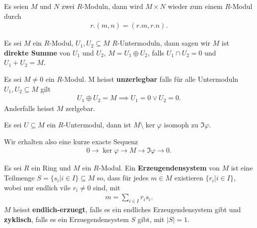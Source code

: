 \documentclass[../Algebra_script.tex]{subfiles}
\begin{document}
    \begin{definition}
        Es seien $M$ und $N$ zwei $R$-Moduln, dann wird $M \times N$ wieder zum einem $R$-Modul durch
        \begin{align*}
            r.(m, n) = (r.m, r.n)
        .\end{align*}
    \end{definition}

    \begin{definition}
        Es sei $M$ ein $R$-Modul, $U_1, U_2 \subseteq M$ $R$-Untermoduln, dann sagen wir $M$ ist \textbf{direkte Summe} von  $U_1$ und $U_2$, $M = U_1 \oplus
        U_2$, falls $U_1 \cap U_2 = 0$ und $U_1 + U_2 = M$.
    \end{definition}

    \begin{definition}
        Es sei $M \neq 0$ ein $R$-Modul. M heisst \textbf{unzerlegbar} falls für alle Untermoduln $U_1, U_2 \subseteq M$ gilt 
        \begin{align*}
            U_1 \oplus U_2 = M \implies U_1 = 0 \vee U_2 = 0
        .\end{align*}
        Anderfalls heisst $M$ zerlgebar.
    \end{definition}

    \begin{proposition}
        Es sei $U \subseteq M$ ein $R$-Untermodul, dann ist $M\setminus \ker \varphi$ isomoph zu $\Im \varphi$.

        Wir erhalten also eine kurze exacte Sequenz
        \begin{align*}
            0 \to \ker \varphi \to M \to \Im \varphi \to 0
        .\end{align*}
    \end{proposition}

    \begin{definition}
        Es sei $R$ ein Ring und $M$ ein $R$-Modul. Ein \textbf{Erzeugendensystem} von $M$ ist eine Teilmenge  $S = \{s_{i} | i \in I\} \subseteq M$ so, dass für
        jedes $m \in M$ existieren $\{r_{i} | i \in I\}$, wobei nur endlich vile $r_{i} \neq 0$ sind, mit
        \begin{align*}
            m = \sum_{i \in I} r_{i}s_{i}
        .\end{align*}
        $M$ heisst \textbf{endlich-erzuegt}, falls es ein endliches Erzeugendensystem gibt und \textbf{zyklisch}, falls es ein Erzuegendensystem $S$ gibt, mit
        $|S| = 1$.
    \end{definition}
\end{document}
